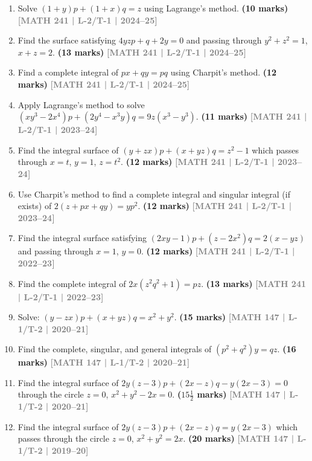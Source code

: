 \documentclass[12pt,a4paper]{article}
\newcommand{\yr}[1]{\hfill\textcolor{gray}{\small\textbf{[#1]}}}
\newcommand{\mk}[1]{\textcolor{orange!70!black}{\small\textbf{(#1 marks)}}}
\begin{document}
\begin{enumerate}\item Solve $(1+y)p+(1+x)q=z$ using Lagrange's method.
\mk{10} \yr{MATH 241 | L-2/T-1 | 2024--25}

\item Find the surface satisfying $4yzp+q+2y=0$ and passing through $y^{2}+z^{2}=1$, $x+z=2$.
\mk{13} \yr{MATH 241 | L-2/T-1 | 2024--25}

\item Find a complete integral of $px+qy=pq$ using Charpit's method.
\mk{12} \yr{MATH 241 | L-2/T-1 | 2024--25}

\item Apply Lagrange's method to solve $(xy^{3}-2x^{4})p+(2y^{4}-x^{3}y)q=9z(x^{3}-y^{3})$.
\mk{11} \yr{MATH 241 | L-2/T-1 | 2023--24}

\item Find the integral surface of $(y+zx)p+(x+yz)q=z^{2}-1$ which passes through $x=t$, $y=1$, $z=t^{2}$.
\mk{12} \yr{MATH 241 | L-2/T-1 | 2023--24}

\item Use Charpit's method to find a complete integral and singular integral (if exists) of $2(z+px+qy)=yp^{2}$.
\mk{12} \yr{MATH 241 | L-2/T-1 | 2023--24}

\item Find the integral surface satisfying $(2xy-1)p+(z-2x^{2})q=2(x-yz)$ and passing through $x=1$, $y=0$.
\mk{12} \yr{MATH 241 | L-2/T-1 | 2022--23}

\item Find the complete integral of $2x(z^{2}q^{2}+1)=pz$.
\mk{13} \yr{MATH 241 | L-2/T-1 | 2022--23}

\item Solve: $(y-zx)p+(x+yz)q=x^{2}+y^{2}$.
\mk{15} \yr{MATH 147 | L-1/T-2 | 2020--21}

\item Find the complete, singular, and general integrals of $(p^{2}+q^{2})y=qz$.
\mk{16} \yr{MATH 147 | L-1/T-2 | 2020--21}

\item Find the integral surface of $2y(z-3)p+(2x-z)q-y(2x-3)=0$ through the circle $z=0$, $x^{2}+y^{2}-2x=0$.
\mk{$15\tfrac{1}{2}$} \yr{MATH 147 | L-1/T-2 | 2020--21}

\item Find the integral surface of $2y(z-3)p+(2x-z)q=y(2x-3)$ which passes through the circle $z=0$, $x^{2}+y^{2}=2x$.
\mk{20} \yr{MATH 147 | L-1/T-2 | 2019--20}


\end{enumerate}
\end{document}
